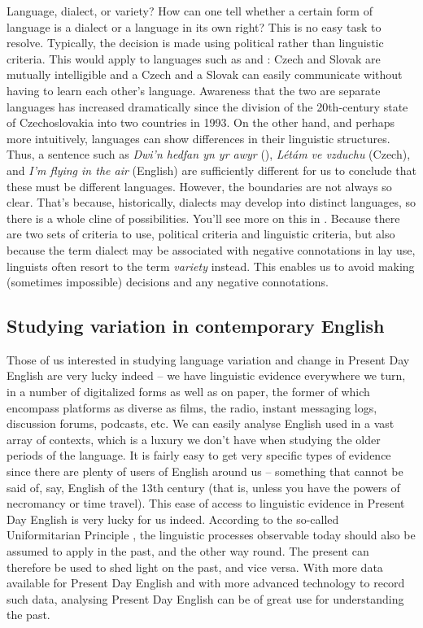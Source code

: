 \begin{varietybox}{Language, dialect, or variety?}
How can one tell whether a certain form of language is a dialect or a language in its own right? This is no easy task to resolve. Typically, the decision is made using political rather than linguistic criteria. This would apply to languages such as  and : Czech and Slovak are mutually intelligible and a Czech and a Slovak can easily communicate without having to learn each other's language. Awareness that the two are separate languages has increased dramatically since the division of the 20th-century state of Czechoslovakia into two countries in 1993. On the other hand, and perhaps more intuitively, languages can show differences in their linguistic structures. Thus, a sentence such as \textit{Dwi'n hedfan yn yr awyr} (), \textit{Létám ve vzduchu} (Czech), and \textit{I'm flying in the air} (English) are sufficiently different for us to conclude that these must be different languages. However, the boundaries are not always so clear. That's because, historically, dialects may develop into distinct languages, so there is a whole cline of possibilities. You'll see more on this in . Because there are two sets of criteria to use, political criteria and linguistic criteria, but also because the term dialect may be associated with negative connotations in lay use, linguists often resort to the term \emph{variety} instead. This enables us to avoid making (sometimes impossible) decisions and any negative connotations.
\end{varietybox}

\largerpage
\subsection{Studying variation in contemporary English}
Those of us interested in studying language variation and change in Present Day English are very lucky indeed -- we have linguistic evidence everywhere we turn, in a number of digitalized forms as well as on paper, the former of which encompass platforms as diverse as films, the radio, instant messaging logs, discussion forums, podcasts, etc. We can easily analyse English used in a vast array of contexts, which is a luxury we don't have when studying the older periods of the language. It is fairly easy to get very specific types of evidence since there are plenty of users of English around us -- something that cannot be said of, say, English of the 13th century (that is, unless you have the powers of necromancy or time travel). This ease of access to linguistic evidence in Present Day English is very lucky for us indeed. According to the so-called Uniformitarian Principle \citep[21--24]{Labov1994}, the linguistic processes observable today should also be assumed to apply in the past, and the other way round. The present can therefore be used to shed light on the past, and vice versa. With more data available for Present Day English and with more advanced technology to record such data, analysing Present Day English can be of great use for understanding the past. 

